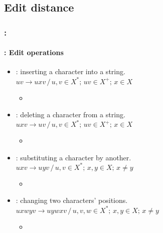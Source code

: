 \documentclass[xcolor=table]{beamer}
\begin{document}
\subsection{Edit distance}

\begin{frame}
	\frametitle{\insertshortsubtitle: \insertsection}
	\framesubtitle{\insertsubsection: Edit operations}

	\begin{itemize}
		\item {}: inserting a character into a string.\\
		$uv \rightarrow uxv \,/\, u, v \in X^*;\, uv \in X^+;\, x \in X$
		\begin{itemize}
			\item {}
		\end{itemize}
		
		\item {}: deleting a character from a string.\\
		$uxv \rightarrow uv \,/\, u, v \in X^*;\, uv \in X^+;\, x \in X$
		\begin{itemize}
			\item {}
		\end{itemize}
		
		\item {}: substituting a character by another.\\
		$uxv \rightarrow uyv \,/\, u, v \in X^*;\, x, y \in X;\, x \ne y$
		\begin{itemize}
			\item {}
		\end{itemize}
		
		\item {}: changing two characters' positions.\\
		$uxwyv \rightarrow uywxv \,/\, u, v, w \in X^*;\, x, y \in X;\, x \ne y$
		\begin{itemize}
			\item {}
		\end{itemize}
	\end{itemize}

\end{frame}
\end{document}
